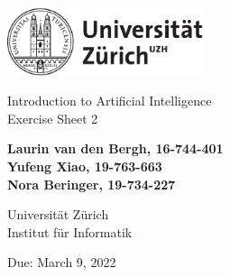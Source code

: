 \documentclass[12pt]{article}
\begin{document}
\begin{titlepage}
\includegraphics[height=20mm]{images/uzh_logo}\\

\begin{flushleft}

\vspace{2cm}

{\Large Introduction to Artificial Intelligence\\Exercise Sheet 2}\\

\vspace{4cm}

\textbf{Laurin van den Bergh, 16-744-401\\Yufeng Xiao, 19-763-663\\Nora Beringer, 19-734-227}\\

\vspace{2cm}

Universität Zürich\\
Institut für Informatik

\vfill Due: March 9, 2022

\vspace{3cm}


\end{flushleft}
\end{titlepage}

\newpage
\end{document}
